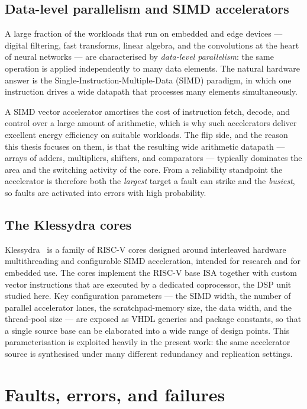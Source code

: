 \subsection{Data-level parallelism and SIMD accelerators}

A large fraction of the workloads that run on embedded and edge devices ---
digital filtering, fast transforms, linear algebra, and the convolutions at the
heart of neural networks --- are characterised by \emph{data-level parallelism}:
the same operation is applied independently to many data elements. The natural
hardware answer is the Single-Instruction-Multiple-Data (SIMD) paradigm, in
which one instruction drives a wide datapath that processes many elements
simultaneously.

A SIMD vector accelerator amortises the cost of instruction fetch, decode, and
control over a large amount of arithmetic, which is why such accelerators
deliver excellent energy efficiency on suitable workloads. The flip side, and
the reason this thesis focuses on them, is that the resulting wide arithmetic
datapath --- arrays of adders, multipliers, shifters, and comparators ---
typically dominates the area and the switching activity of the core. From a
reliability standpoint the accelerator is therefore both the \emph{largest}
target a fault can strike and the \emph{busiest}, so faults are activated into
errors with high probability.

\subsection{The Klessydra cores}

Klessydra~\cite{klessydra,klessydra-dsp} is a family of RISC-V cores designed around interleaved hardware
multithreading and configurable SIMD acceleration, intended for research and for
embedded use. The cores implement the RISC-V base ISA together with custom
vector instructions that are executed by a dedicated coprocessor, the DSP unit
studied here. Key configuration parameters --- the SIMD width, the number of
parallel accelerator lanes, the scratchpad-memory size, the data width, and the
thread-pool size --- are exposed as VHDL generics and package constants, so that
a single source base can be elaborated into a wide range of design points. This
parameterisation is exploited heavily in the present work: the same accelerator
source is synthesised under many different redundancy and replication settings.

\section{Faults, errors, and failures}
\label{sec:faults}

